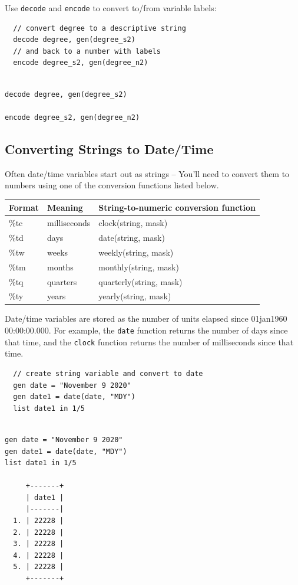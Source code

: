 \documentclass[]{book}
\begin{document}
Use \texttt{decode} and \texttt{encode} to convert to/from variable labels:

\begin{verbatim}
  // convert degree to a descriptive string
  decode degree, gen(degree_s2)
  // and back to a number with labels
  encode degree_s2, gen(degree_n2)
\end{verbatim}

\begin{verbatim}

decode degree, gen(degree_s2)

encode degree_s2, gen(degree_n2)
\end{verbatim}

\hypertarget{converting-strings-to-datetime}{%
\subsection{Converting Strings to Date/Time}\label{converting-strings-to-datetime}}

Often date/time variables start out as strings -- You'll need to convert them to numbers using one of the conversion functions listed below.

\begin{longtable}[]{@{}lll@{}}
\toprule
Format & Meaning & String-to-numeric conversion function\tabularnewline
\midrule
\endhead
\%tc & milliseconds & clock(string, mask)\tabularnewline
\%td & days & date(string, mask)\tabularnewline
\%tw & weeks & weekly(string, mask)\tabularnewline
\%tm & months & monthly(string, mask)\tabularnewline
\%tq & quarters & quarterly(string, mask)\tabularnewline
\%ty & years & yearly(string, mask)\tabularnewline
\bottomrule
\end{longtable}

Date/time variables are stored as the number of units elapsed since 01jan1960 00:00:00.000. For example, the \texttt{date} function returns the number of days since that time, and the \texttt{clock} function returns the number of milliseconds since that time.

\begin{verbatim}
  // create string variable and convert to date
  gen date = "November 9 2020"
  gen date1 = date(date, "MDY")
  list date1 in 1/5
\end{verbatim}

\begin{verbatim}

gen date = "November 9 2020"
gen date1 = date(date, "MDY")
list date1 in 1/5

     +-------+
     | date1 |
     |-------|
  1. | 22228 |
  2. | 22228 |
  3. | 22228 |
  4. | 22228 |
  5. | 22228 |
     +-------+
\end{verbatim}
\end{document}
